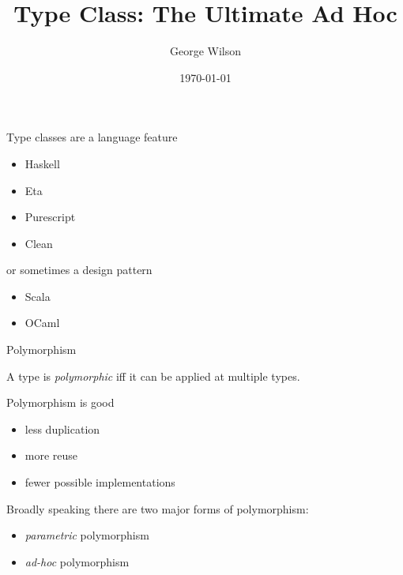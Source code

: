 \documentclass[usenames,dvipsnames,svgnames,table,aspectratio=169,mathserif]{beamer}
\title[Type Class: The Ultimate Ad Hoc]{Type Class: The Ultimate Ad Hoc} %
\author{George Wilson} %
\institute[] %
{
Data61/CSIRO\\ %
\medskip
\href{george.wilson@data61.csiro.au}{george.wilson@data61.csiro.au} %
}
\date{\today} %
\begin{document}


\begin{frame}
\titlepage %
\end{frame}


\begin{frame}

Type classes are a language feature

\begin{itemize}
\item Haskell
\item Eta
\item Purescript
\item Clean
\end{itemize}

\pause

or sometimes a design pattern

\begin{itemize}
\item Scala
\item OCaml
\end{itemize}

\end{frame}



\begin{frame}
\begin{center}
\huge{Polymorphism}
\end{center}
\end{frame}


\begin{frame}
A type is {\it polymorphic} iff it can be applied at multiple types.
\end{frame}


\begin{frame}
\begin{center}
Polymorphism is good


\begin{itemize}
\item less duplication
\item more reuse
\item fewer possible implementations
\end{itemize}
\end{center}
\end{frame}


\begin{frame}
Broadly speaking there are two major forms of polymorphism:

\begin{itemize}
\item {\it parametric} polymorphism
\item {\it ad-hoc} polymorphism
\end{itemize}
\end{frame}
\end{document}
